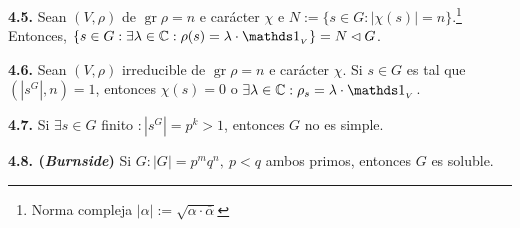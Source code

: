 \begin{lemma}
    \textbf{4.5.} Sean \((V, \rho)\) de \(\operatorname{gr}\rho = n\) e carácter \(\chi\) e \( N:= \{s \in G : |\chi(s)| = n\}\).\footnote{Norma compleja \(|\alpha | := \sqrt{\alpha\cdot \overline{\alpha}}\)} Entonces, \(\{s \in G : \exists \lambda \in \C : \rho(s) = \lambda \cdot \id_{_V}\} = N \lhd G\). 
\end{lemma}


\begin{lemma}
    \textbf{4.6.} Sean \((V,\rho)\) irreducible de \(\operatorname{gr}\rho = n\) e carácter \(\chi\). Si \(s \in G \)  es tal que \((|s^G|, n) = 1\), entonces \(\chi(s) = 0 \) o \(\exists \lambda \in \C : \rho_s = \lambda \cdot \id_{_V}\).  
\end{lemma}

\begin{theorem}
    \textbf{4.7.} Si \( \exists s \in  G  \) finito \(:  |s^G| = p^k > 1\), entonces \(G\) no es simple. 
\end{theorem}

\begin{theorem}
    \textbf{4.8. (\emph{Burnside})} Si \( G : |G | = p^mq^n, \ p<q\) ambos primos, entonces \(G\) es soluble. 
\end{theorem}